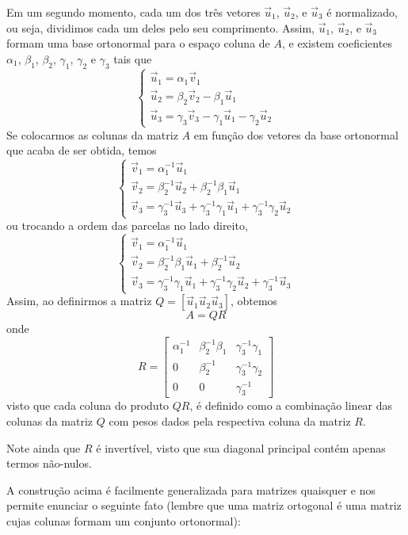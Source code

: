 \documentclass[../livro.tex]{subfiles}  %
\begin{document}
Em um segundo momento, cada um dos três vetores $\vec{u}_1$, $\vec{u}_2$, e $\vec{u}_3$ é normalizado, ou seja, dividimos cada um deles pelo seu comprimento. Assim, $\vec{u}_1$, $\vec{u}_2$, e $\vec{u}_3$ formam uma base ortonormal para o espaço coluna de $A$, e  existem coeficientes $\alpha_1$, $\beta_1$, $\beta_2$, $\gamma_1$, $\gamma_2$ e $\gamma_3$ tais que 
$$
\begin{cases}
\vec{u}_1 = \alpha_1\vec{v}_1 \\ 
\vec{u}_2 = \beta_2 \vec{v}_2 - \beta_1 \vec{u}_1 \\
\vec{u}_3 = \gamma_3 \vec{v}_3 - \gamma_1 \vec{u}_1 - \gamma_2 \vec{u}_2
\end{cases}
$$
Se colocarmos as colunas da matriz $A$ em função dos vetores da base ortonormal que acaba de ser obtida, temos 
$$
\begin{cases}
\vec{v}_1 = \alpha_1^{-1}\vec{u}_1 \\ 
\vec{v}_2 = \beta_2^{-1} \vec{u}_2 + \beta_2^{-1}\beta_1 \vec{u}_1 \\
\vec{v}_3 = \gamma_3^{-1} \vec{u}_3 + \gamma_3^{-1}\gamma_1 \vec{u}_1 + \gamma_3^{-1}\gamma_2 \vec{u}_2
\end{cases}
$$
ou trocando a ordem das parcelas no lado direito,
$$
\begin{cases}
\vec{v}_1 = \alpha_1^{-1}\vec{u}_1 \\ 
\vec{v}_2 =  \beta_2^{-1}\beta_1 \vec{u}_1 + \beta_2^{-1} \vec{u}_2 \\
\vec{v}_3 =   \gamma_3^{-1}\gamma_1 \vec{u}_1 + \gamma_3^{-1}\gamma_2 \vec{u}_2 + \gamma_3^{-1} \vec{u}_3
\end{cases}
$$
Assim, ao definirmos a matriz $Q=[\vec{u}_1 \vec{u}_2  \vec{u}_3] $, obtemos $$A=QR$$
onde 
\[
R =
\begin{bmatrix}
\alpha_1^{-1}  & \beta_2^{-1}\beta_1  & \gamma_3^{-1}\gamma_1 \\
0 & \beta_2^{-1} & \gamma_3^{-1}\gamma_2 \\
0 & 0 & \gamma_3^{-1}
\end{bmatrix}
\]
visto que cada coluna do produto $QR$, é definido como a combinação linear das colunas da matriz $Q$ com pesos dados pela respectiva coluna da matriz $R$.

Note ainda que $R$ é invertível, visto que sua diagonal principal contém apenas termos não-nulos.

A construção acima é facilmente generalizada para matrizes quaisquer e nos permite enunciar o seguinte fato
(lembre que uma matriz ortogonal é uma matriz cujas colunas formam um conjunto ortonormal):
\end{document}
